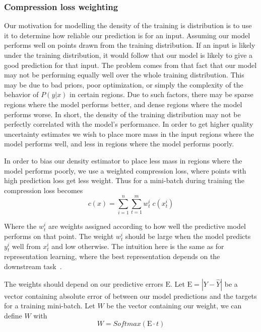\documentclass[../main.tex]{subfiles}
\begin{document}
\subsubsection{Compression loss weighting}

Our motivation for modelling the density of the training is distribution is to use it to determine how reliable our prediction is for an input. Assuming our model performs well on points drawn from the training distribution.
If an input is likely under the training distribution, it would follow that our model is likely to give a good prediction for that input. The problem comes from that fact that our model may not be performing equally well over the whole training distribution. This may be due to bad priors, poor optimization, or simply the complexity of the behavior of $P(y|x)$ in certain regions. Due to such factors, there may be sparse regions where the model performs better, and dense regions where the model performs worse. In short, the density of the training distribution may not be perfectly correlated with the model's performance. In order to get higher quality uncertainty estimates we wish to place more mass in the input regions where the model performs well, and less in regions where the model performs poorly. 

In order to bias our density estimator to place less mass in regions where the model performs poorly, we use a weighted compression loss, where points with high prediction loss get less weight. Thus for a mini-batch during training the compression loss becomes 
\begin{equation}
    c(x) = \sum_{i=1}^{n} \sum_{t=1}^{m} w^i_t \; c(x^i_t)  
\end{equation}

Where the $w^i_t$ are weights assigned according to how well the predictive model performs on that point. The weight $w^i_t$ should be large when the model predicts $y^i_t$  well from $x^i_t$ and low otherwise. The intuition here is the same as for representation learning, where the best representation depends on the downstream task~\citep{hjelm2018learning}.

The weights should depend on our predictive errors $\mathrm{E}$. Let $\mathrm{E} = |Y - \hat{Y}|$ be a vector containing absolute error of between our model predictions and the targets for a training mini-batch. Let $W$ be the vector containing our weight, we can define $W$ with 
\begin{equation}
    W = Softmax(\mathrm{E} \cdot t)
\end{equation}{}
\end{document}
